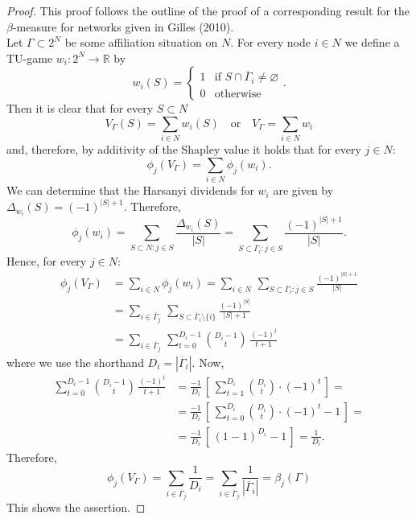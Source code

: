 \begin{proof}
This proof follows the outline of the proof of a corresponding result for the $\beta$-measure for networks given in Gilles (2010).
\\
Let $\Gamma \subset 2^N$ be some affiliation situation on $N$. For every node $i \in N$ we define a TU-game $w_i \colon 2^N \to \mathbb{R}$ by
\begin{equation}
w_i (S) = \left\{
\begin{array}{ll}
1 & \mbox{if } S \cap \overline{\Gamma}_i \neq \varnothing \\
0 & \mbox{otherwise}
\end{array} \right. .
\end{equation}
Then it is clear that for every $S \subset N$
\begin{equation}
V_{\Gamma} (S) = \sum_{i \in N} w_i (S) \quad \mbox{or} \quad V_{\Gamma} = \sum_{i \in N} w_i
\end{equation}
and, therefore, by additivity of the Shapley value it holds that for every $j \in N \colon$
\begin{equation}
\phi_j \left( V_{\Gamma} \right) = \sum_{i \in N} \phi_j \left( w_i \right) .
\end{equation}
We can determine that the Harsanyi dividends for $w_i$ are given by $\Delta_{w_i} (S) = (-1)^{|S|+1}$. Therefore,
\begin{equation}
\phi_j (w_i) = \sum_{S \subset N \colon j \in S} \frac{\Delta_{w_i} (S)}{|S|} = \sum_{S \subset \overline{\Gamma}_i \colon j \in S} \frac{(-1)^{|S|+1}}{|S|} .
\end{equation}
Hence, for every $j \in N \colon$
\begin{align*}
\phi_j \left( V_{\Gamma} \right) & = \sum_{i \in N} \phi_j (w_i) = \sum_{i \in N} \, \sum_{S \subset \overline{\Gamma}_i \colon j \in S} \frac{(-1)^{|S|+1}}{|S|} \\[1ex]
& = \sum_{i \in \overline{\Gamma}_j} \, \sum_{S \subset \overline{\Gamma}_i \setminus \{ i \} } \frac{(-1)^{|S|}}{|S|+1} \\[1ex]
& = \sum_{i \in \overline{\Gamma}_j} \, \sum^{D_i-1}_{t=0} \binom{D_i-1}{t} \, \frac{(-1)^t}{t+1}
\end{align*}
where we use the shorthand $D_i = \left| \overline{\Gamma}_i \right|$. Now,
\begin{align*}
\sum^{D_i-1}_{t=0} \binom{D_i-1}{t} \, \frac{(-1)^t}{t+1} & = \frac{-1}{D_i} \, \left[ \, \sum^{D_i}_{t=1} \binom{D_i}{t} \cdot (-1)^t \, \right] = \\[1ex]
& = \frac{-1}{D_i} \, \left[ \, \sum^{D_i}_{t=0} \binom{D_i}{t} \cdot (-1)^t -1 \, \right] = \\[1ex]
& = \frac{-1}{D_i} \, \left[ \, (1-1)^{D_i} -1 \, \right] = \frac{1}{D_i} .
\end{align*}
Therefore,
\[
\phi_j \left( V_{\Gamma} \right) = \sum_{i \in \overline{\Gamma}_j} \frac{1}{D_i} = \sum_{i \in \overline{\Gamma}_j} \frac{1}{\left| \overline{\Gamma}_i \right|} = \beta_j (\Gamma )
\]
This shows the assertion.
\end{proof}

